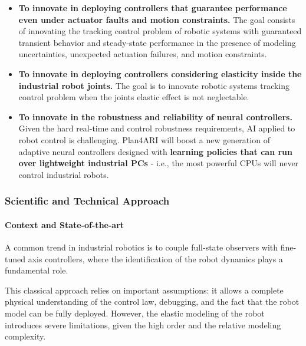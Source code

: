 \begin{itemize}
\item
  \textbf{To innovate in deploying controllers that guarantee
  performance even under actuator faults and motion constraints.} The
  goal consists of innovating the tracking control problem of robotic
  systems with guaranteed transient behavior and steady-state
  performance in the presence of modeling uncertainties, unexpected
  actuation failures, and motion constraints.
\item
  \textbf{To innovate in deploying controllers considering elasticity
  inside the industrial robot joints.} The goal is to innovate robotic
  systems\textquotesingle{} tracking control problem when the
  joints\textquotesingle{} elastic effect is not neglectable.
\item
  \textbf{To innovate in the robustness and reliability of neural
  controllers.} Given the hard real-time and control robustness
  requirements, AI applied to robot control is challenging. Plan4ARI
  will boost a new generation of adaptive neural controllers designed
  with \textbf{learning policies that can run over lightweight
  industrial PCs} - i.e., the most powerful CPUs will never control
  industrial robots.
\end{itemize}

\subsubsection{Scientific and Technical
Approach}\label{scientific-and-technical-approach-2}

\paragraph{Context and
State-of-the-art}\label{context-and-state-of-the-art-2}

A common trend in industrial robotics is to couple full-state observers
with fine-tuned axis controllers, where the identification of the robot
dynamics plays a fundamental role.

This classical approach relies on important assumptions: it allows a
complete physical understanding of the control law, debugging, and the
fact that the robot model can be fully deployed. However, the elastic
modeling of the robot introduces severe limitations, given the high
order and the relative modeling complexity.

